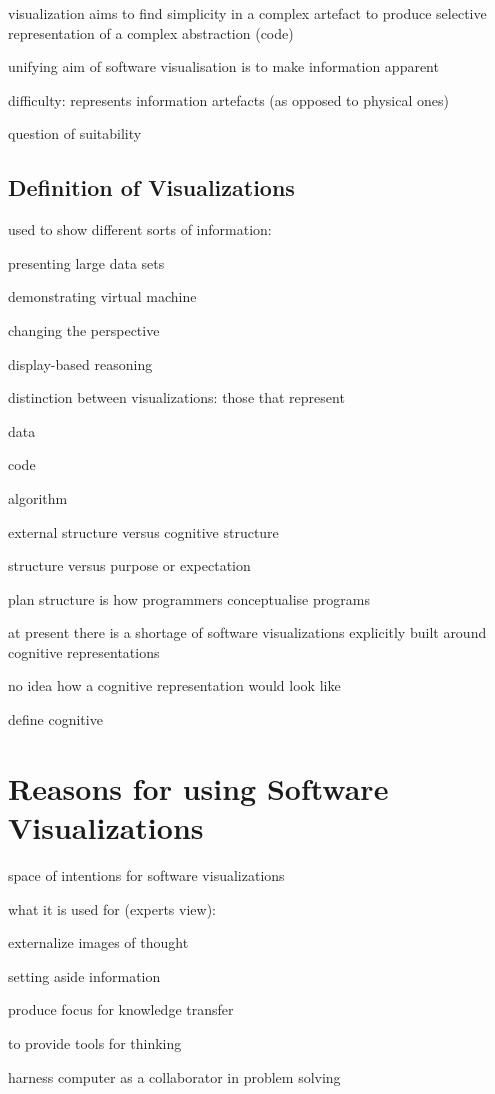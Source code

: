 \documentclass[11pt, a4paper, ngerman, twoside]{article}
\theoremstyle{plain}\newtheorem{Lemma}{Lemma}
\theoremstyle{plain}\newtheorem{Satz}[Lemma]{Satz}
\theoremstyle{definition}\newtheorem{Definition}[Lemma]{Definition}
\theoremstyle{definition}\newtheorem*{Beispiel}{Beispiel}
\theoremstyle{remark}\newtheorem*{Bemerkung}{Bemerkung}
\begin{document}
visualization aims to find simplicity in a complex artefact to produce selective representation of a complex abstraction (code)

unifying aim of software visualisation is to make information apparent

difficulty: represents information artefacts (as opposed to physical ones)

question of suitability

\subsection{Definition of Visualizations}

used to show different sorts of information:

presenting large data sets

demonstrating virtual machine

changing the perspective

display-based reasoning

distinction between visualizations: those that represent

data

code

algorithm

external structure versus cognitive structure

structure versus purpose or expectation

plan structure is how programmers conceptualise programs

at present there is a shortage of software visualizations explicitly built around cognitive representations

no idea how a cognitive representation would look like

define cognitive

\section{Reasons for using Software Visualizations}

space of intentions for software visualizations

what it is used for (experts view):

externalize images of thought

setting aside information

produce focus for knowledge transfer

to provide tools for thinking

harness computer as a collaborator in problem solving
\end{document}
